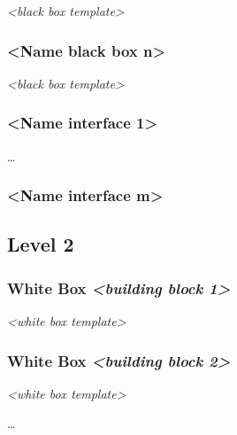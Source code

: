 \documentclass[
]{article}
\begin{document}
\emph{\textless black box template\textgreater{}}

\hypertarget{__name_black_box_n}{%
\subsubsection{\textless Name black box
n\textgreater{}}\label{__name_black_box_n}}

\emph{\textless black box template\textgreater{}}

\hypertarget{__name_interface_1}{%
\subsubsection{\textless Name interface
1\textgreater{}}\label{__name_interface_1}}

\ldots{}

\hypertarget{__name_interface_m}{%
\subsubsection{\textless Name interface
m\textgreater{}}\label{__name_interface_m}}

\hypertarget{_level_2}{%
\subsection{Level 2}\label{_level_2}}

\hypertarget{_white_box_emphasis_building_block_1_emphasis}{%
\subsubsection{\texorpdfstring{White Box \emph{\textless building block
1\textgreater{}}}{White Box \textless building block 1\textgreater{}}}\label{_white_box_emphasis_building_block_1_emphasis}}

\emph{\textless white box template\textgreater{}}

\hypertarget{_white_box_emphasis_building_block_2_emphasis}{%
\subsubsection{\texorpdfstring{White Box \emph{\textless building block
2\textgreater{}}}{White Box \textless building block 2\textgreater{}}}\label{_white_box_emphasis_building_block_2_emphasis}}

\emph{\textless white box template\textgreater{}}

\ldots{}
\end{document}

